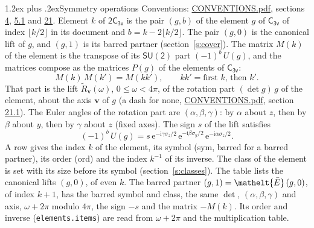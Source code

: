 \documentclass[10pt,a4paper]{article}
\makeatletter
\renewcommand\section{\@startsection{section}{1}{\z@}{-3ex plus -1ex minus -.2ex}%
  {1.2ex plus .2ex}{\normalfont\large\sffamily\bfseries\color{parttitle}}}
\numberwithin{equation}{section}
\newcommand{\eltfont}[1]{{\let\sigma\eltsigma\mathelt{#1}}}
\newcommand{\grp}[1]{\mathsf{#1}}
\newcommand{\elt}[1]{\eltfont{#1}}
\newcommand{\vv}{\mathbf{v}}
\newcommand{\iunit}{\mathrm{i}}
\newcommand{\expe}{\mathrm{e}}
\newcommand{\barred}[1]{\bar{#1}}
\newcommand{\lift}[1]{\tilde{#1}}
\newcommand{\pauli}[1]{\sigma_{#1}}
\makeatother
\begin{document}
\section{Symmetry operations}\label{s:elements}
Conventions: \href{../../CONVENTIONS.pdf}{CONVENTIONS.pdf}, sections \href{../../../rotation/CONVENTIONS.pdf\#conv.4}{4}, \href{../../../rotation/CONVENTIONS.pdf\#conv.5.1}{5.1} and \href{../../CONVENTIONS.pdf\#conv.21}{21}.
\leavevmode\label{n:index.element}\label{n:element.g}Element $k$ of $\grp{2C_{3v}}$ is the pair $(g, b)$ of the element $g$ of \href{../../../rotation/data/pdf/C3v.pdf}{$\grp{C_{3v}}$} of index $\lfloor k/2\rfloor$ in its document and $b = k - 2\lfloor k/2\rfloor$. The pair $(g, 0)$ is the canonical lift of $g$, and $(g, 1)$ is its barred partner (section~\ref{s:cover}). \label{n:matrix.element.pin}\label{n:matrix.element}The matrix $M(k)$ of the element is the transpose of its $\grp{SU(2)}$ part $(-1)^{b}\,U(g)$, and the matrices compose as the matrices $P(g)$ of the elements of $\grp{C_{3v}}$:
\begin{equation}\label{e:mprod}M(k)\,M(k') = M(kk'),\qquad kk' = \text{first } k\text{, then } k'.\end{equation}
\leavevmode\label{n:angle.omega}\label{n:vector.axis}\label{n:vector.pole}That part is the lift $\lift{R}_{\vv}(\omega)$, $0 \le \omega < 4\pi$, of the rotation part $(\det g)\,g$ of the element, about the axis $\vv$ of $g$ (a dash for none, \href{../../CONVENTIONS.pdf}{CONVENTIONS.pdf}, section \href{../../CONVENTIONS.pdf\#conv.21.1}{21.1}). \label{n:angle.euler.alpha}\label{n:angle.euler.beta}\label{n:angle.euler.gamma}\label{n:vector.coordinates}The Euler angles of the rotation part are $(\alpha,\beta,\gamma)$: by $\alpha$ about $z$, then by $\beta$ about $y$, then by $\gamma$ about $z$ (fixed axes). \label{n:local.euler.sign}The sign $s$ of the lift satisfies
\begin{equation}\label{e:euler}(-1)^{b}\,U(g) = s\,\expe^{-\iunit\gamma\pauli{z}/2}\,\expe^{-\iunit\beta\pauli{y}/2}\,\expe^{-\iunit\alpha\pauli{z}/2}.\end{equation}
\leavevmode\label{n:index.element.inverse}\label{n:head.sym}\label{n:head.ord}A row gives the index $k$ of the element, its symbol (sym, barred for a barred partner), its order (ord) and the index $k^{-1}$ of its inverse. \label{n:head.class}The class of the element is set with its size before its symbol (section~\ref{s:classes}).
The table lists the canonical lifts $(g, 0)$, of even $k$. The barred partner $(g, 1) = \elt{\barred{E}}\,(g, 0)$, of index $k + 1$, has the barred symbol and class, the same $\det$, $(\alpha,\beta,\gamma)$ and axis, $\omega + 2\pi$ modulo $4\pi$, the sign $-s$ and the matrix $-M(k)$. Its order and inverse (\texttt{elements.items}) are read from $\omega + 2\pi$ and the multiplication table.
\end{document}
